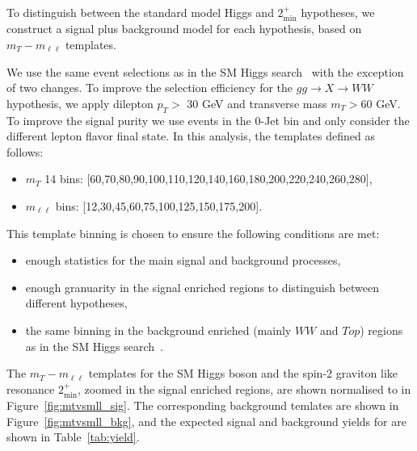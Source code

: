 To distinguish between the standard model Higgs and $2_\text{min}^+$ hypotheses, 
we construct a signal plus background model for each hypothesis, based on 
 $m_T-m_{\ell\ell}$ templates.%

We use the same event selections as in the SM Higgs search~\cite{HWWHCP2012} with the exception of two changes.
To improve the selection efficiency for the $gg\to X\to WW$ hypothesis,
we apply dilepton $p_T>$ 30 GeV and transverse mass $m_T>$60 GeV.
To improve the signal purity we use events in the 0-Jet bin 
and only consider the different lepton flavor final state.
In this analysis, the templates defined as follows:
\begin{itemize}
\item $m_T$ 14 bins: [60,70,80,90,100,110,120,140,160,180,200,220,240,260,280],
\item $m_{\ell\ell}$ bins: [12,30,45,60,75,100,125,150,175,200].
\end{itemize}

This template binning is chosen to ensure the following conditions are met:

\begin{itemize}
    \item enough statistics for the main signal and background processes, 
    \item enough granuarity in the signal enriched regions to distinguish between 
different hypotheses, 
    \item the same binning in the background enriched (mainly $WW$ and $Top$) regions 
as in the SM Higgs search~\cite{HWWHCP2012}. 
\end{itemize}
The $m_T-m_{\ell\ell}$ templates for the SM Higgs boson and 
the spin-2 graviton like resonance $2_\text{min}^+$, zoomed in the 
signal enriched regions, are shown normalised to \intlumiEightTeV 
in Figure~\ref{fig:mtvsmll_sig}.
The corresponding background temlates are shown in 
Figure~\ref{fig:mtvsmll_bkg}, and the expected signal and
background yields for \intlumiEightTeV are shown in Table~\ref{tab:yield}.



